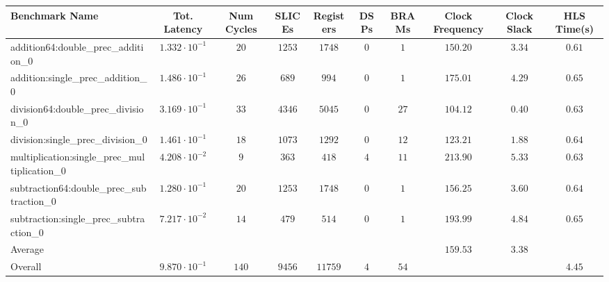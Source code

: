 \begin{tabular}{|l|c|c|c|c|c|c|c|c|c|}
\hline
Benchmark Name                                 & Tot. Latency            & Num Cycles & SLICEs   & Registers & DSPs  & BRAMs  & Clock Frequency & Clock Slack & HLS Time(s) \\
\hline
addition64:double\_prec\_addition\_0           & $ 1.332 \cdot 10^{-1} $ & $ 20     $ & $ 1253 $ & $ 1748  $ & $ 0 $ & $ 1  $ & $ 150.20      $ & $ 3.34    $ & $ 0.61    $ \\
addition:single\_prec\_addition\_0             & $ 1.486 \cdot 10^{-1} $ & $ 26     $ & $ 689  $ & $ 994   $ & $ 0 $ & $ 1  $ & $ 175.01      $ & $ 4.29    $ & $ 0.65    $ \\
division64:double\_prec\_division\_0           & $ 3.169 \cdot 10^{-1} $ & $ 33     $ & $ 4346 $ & $ 5045  $ & $ 0 $ & $ 27 $ & $ 104.12      $ & $ 0.40    $ & $ 0.63    $ \\
division:single\_prec\_division\_0             & $ 1.461 \cdot 10^{-1} $ & $ 18     $ & $ 1073 $ & $ 1292  $ & $ 0 $ & $ 12 $ & $ 123.21      $ & $ 1.88    $ & $ 0.64    $ \\
multiplication:single\_prec\_multiplication\_0 & $ 4.208 \cdot 10^{-2} $ & $ 9      $ & $ 363  $ & $ 418   $ & $ 4 $ & $ 11 $ & $ 213.90      $ & $ 5.33    $ & $ 0.63    $ \\
subtraction64:double\_prec\_subtraction\_0     & $ 1.280 \cdot 10^{-1} $ & $ 20     $ & $ 1253 $ & $ 1748  $ & $ 0 $ & $ 1  $ & $ 156.25      $ & $ 3.60    $ & $ 0.64    $ \\
subtraction:single\_prec\_subtraction\_0       & $ 7.217 \cdot 10^{-2} $ & $ 14     $ & $ 479  $ & $ 514   $ & $ 0 $ & $ 1  $ & $ 193.99      $ & $ 4.84    $ & $ 0.65    $ \\
\hline
Average                                        & $                     $ & $        $ & $      $ & $       $ & $   $ & $    $ & $ 159.53      $ & $ 3.38    $ & $         $ \\
\hline
Overall                                        & $ 9.870 \cdot 10^{-1} $ & $ 140    $ & $ 9456 $ & $ 11759 $ & $ 4 $ & $ 54 $ & $             $ & $         $ & $ 4.45    $ \\
\hline
\end{tabular}
